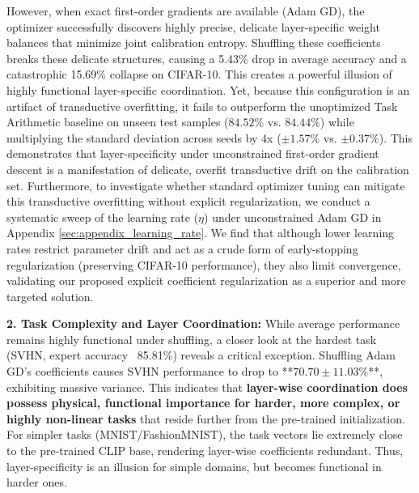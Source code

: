 However, when exact first-order gradients are available (Adam GD), the optimizer successfully discovers highly precise, delicate layer-specific weight balances that minimize joint calibration entropy. Shuffling these coefficients breaks these delicate structures, causing a 5.43\% drop in average accuracy and a catastrophic 15.69\% collapse on CIFAR-10. This creates a powerful illusion of highly functional layer-specific coordination. Yet, because this configuration is an artifact of transductive overfitting, it fails to outperform the unoptimized Task Arithmetic baseline on unseen test samples ($84.52\%$ vs. $84.44\%$) while multiplying the standard deviation across seeds by 4x ($\pm 1.57\%$ vs. $\pm 0.37\%$). This demonstrates that layer-specificity under unconstrained first-order gradient descent is a manifestation of delicate, overfit transductive drift on the calibration set. Furthermore, to investigate whether standard optimizer tuning can mitigate this transductive overfitting without explicit regularization, we conduct a systematic sweep of the learning rate ($\eta$) under unconstrained Adam GD in Appendix \ref{sec:appendix_learning_rate}. We find that although lower learning rates restrict parameter drift and act as a crude form of early-stopping regularization (preserving CIFAR-10 performance), they also limit convergence, validating our proposed explicit coefficient regularization as a superior and more targeted solution.

\textbf{2. Task Complexity and Layer Coordination:}
While average performance remains highly functional under shuffling, a closer look at the hardest task (SVHN, expert accuracy ~85.81\%) reveals a critical exception. Shuffling Adam GD's coefficients causes SVHN performance to drop to **$70.70 \pm 11.03\%$**, exhibiting massive variance. This indicates that \textbf{layer-wise coordination does possess physical, functional importance for harder, more complex, or highly non-linear tasks} that reside further from the pre-trained initialization. For simpler tasks (MNIST/FashionMNIST), the task vectors lie extremely close to the pre-trained CLIP base, rendering layer-wise coefficients redundant. Thus, layer-specificity is an illusion for simple domains, but becomes functional in harder ones.

